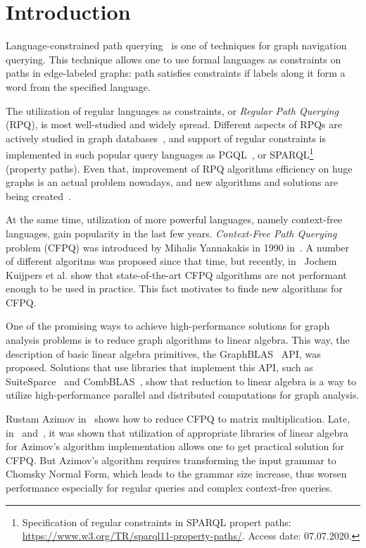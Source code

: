 \section{Introduction}


Language-constrained path querying~\cite{barrett2000formal} is one of techniques for graph navigation querying.
This technique allows one to use formal languages as constraints on paths in edge-labeled graphs: path satisfies constraints if labels along it form a word from the specified language.

The utilization of regular languages as constraints, or \textit{Regular Path Querying} (RPQ), is most well-studied and widely spread.
Different aspects of RPQs are actively studied in graph databases~\cite{10.1145/2463664.2465216, 10.1145/3104031,10.1145/2850413}, and support of regular constraints is implemented in such popular query languages as PGQL~\cite{10.1145/2960414.2960421}, or SPARQL\footnote{Specification of regular constraints in SPARQL propert paths: \url{https://www.w3.org/TR/sparql11-property-paths/}. Access date: 07.07.2020.}~\cite{10.1007/978-3-319-25007-6_1} (property paths).
Even that, improvement of RPQ algorithms efficiency on huge graphs is an actual problem nowadays, and new algorithms and solutions are being created~\cite{Wang2019,10.1145/2949689.2949711}.

At the same time, utilization of more powerful languages, namely context-free languages, gain popularity in the last few years. 
\textit{Context-Free Path Querying} problem (CFPQ) was introduced by Mihalis Yannakakis in 1990 in~\cite{Yannakakis}.
A number of different algoritms was proposed since that time, but recently, in~\cite{Kuijpers:2019:ESC:3335783.3335791} Jochem Kuijpers et al. show that state-of-the-art CFPQ algorithms are not performant enough to be used in practice.
This fact motivates to finde new algorithms for CFPQ.

One of the promising ways to achieve high-performance solutions for graph analysis problems is to reduce graph algorithms to linear algebra.
This way, the description of basic linear algebra primitives, the GraphBLAS~\cite{7761646} API, was proposed.
Solutions that use libraries that implement this API, such as SuiteSparce~\cite{Davis2018Algorithm9S} and CombBLAS~\cite{10.1177/1094342011403516}, show that reduction to linear algebra is a way to utilize high-performance parallel and distributed computations for graph analysis.

Rustam Azimov in~\cite{Azimov:2018:CPQ:3210259.3210264} shows how to reduce CFPQ to matrix multiplication.
Late, in~\cite{Mishin:2019:ECP:3327964.3328503} and~\cite{10.1145/3398682.3399163}, it was shown that utilization of appropriate libraries of linear algebra for Azimov's algorithm implementation allows one to get practical solution for CFPQ.
But Azimov's algorithm requires transforming the input grammar to Chomsky Normal Form, which leads to the grammar size increase, thus worsen performance especially for regular queries and complex context-free queries.


